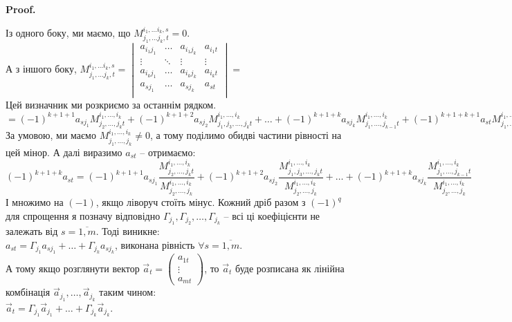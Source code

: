 \documentclass[a4paper, 10pt]{article}
\makeatletter
\theoremstyle{theoremdd}
\renewenvironment{proof}[1][Proof.\\]{\par
\pushQED{\hfill \qed}%
\normalfont \topsep6\p@\@plus6\p@\relax
\trivlist
\item\relax
{\bfseries
#1\@addpunct{.}}\hspace\labelsep\ignorespaces
}{%
\popQED\endtrivlist\@endpefalse
}
\makeatother
\begin{document}
\begin{proof}
Із одного боку, ми маємо, що $M_{j_1,\dots j_k,t}^{i_1, \dots i_k,s} = 0$.\\
А з іншого боку, $M_{j_1,\dots j_k,t}^{i_1, \dots i_k,s} = \begin{vmatrix}
a_{i_1 j_1} & \dots & a_{i_1 j_k} & a_{i_1 t} \\
\vdots & \ddots & \vdots & \vdots \\
a_{i_k j_1} & \dots & a_{i_k j_k} & a_{i_k t} \\
a_{s j_1} & \dots & a_{s j_k} & a_{s t} \\
\end{vmatrix} \boxed{=}$\\
Цей визначник ми розкриємо за останнім рядком.\\
$\boxed{=} (-1)^{k+1+1} a_{sj_1} M_{j_2,\dots,j_k t}^{i_1,\dots,i_k} + (-1)^{k+1+2} a_{sj_2} M_{j_1,j_3,\dots,j_k t}^{i_1,\dots,i_k} + \dots + (-1)^{k+1+k} a_{sj_k}M_{j_1,\dots,j_{k-1} t}^{i_1,\dots,i_k} + (-1)^{k+1+k+1}a_{st} M_{j_1,\dots,j_k}^{i_1,\dots,i_k}$\\
За умовою, ми маємо $M_{j_1,\dots,j_k}^{i_1,\dots,i_k} \neq 0$, а тому поділимо обидві частини рівності на цей мінор. А далі виразимо $a_{st}$ -- отримаємо:\\
$(-1)^{k+1+k}a_{st} = (-1)^{k+1+1} a_{sj_1} \dfrac{M_{j_2,\dots,j_k t}^{i_1,\dots,i_k}}{M_{j_2,\dots,j_k}^{i_1,\dots,i_k}}  + (-1)^{k+1+2} a_{sj_2} \dfrac{M_{j_1,j_3,\dots,j_k t}^{i_1,\dots,i_k}}{M_{j_2,\dots,j_k}^{i_1,\dots,i_k}} + \dots + (-1)^{k+1+k} a_{sj_k} \dfrac{M_{j_1,\dots,j_{k-1} t}^{i_1,\dots,i_k}}{M_{j_2,\dots,j_k}^{i_1,\dots,i_k}}$\\
І множимо на $(-1)$, якщо ліворуч стоїть мінус. Кожний дріб разом з $(-1)^q$ для спрощення я позначу відповідно $\Gamma_{j_1}, \Gamma_{j_2},\dots,\Gamma_{j_k}$ -- всі ці коефіцієнти не залежать від $s = \overline{1,m}$. Тоді виникне:\\
$a_{st} = \Gamma_{j_1} a_{sj_1} + \dots + \Gamma_{j_k} a_{sj_k}$, виконана рівність $\forall s = \overline{1,m}$. \\
А тому якщо розглянути вектор $\vec{a}_t = \begin{pmatrix}
a_{1t} \\ \vdots \\ a_{mt}
\end{pmatrix}$, то $\vec{a}_t$ буде розписана як лінійна комбінація $\vec{a}_{j_1},\dots,\vec{a}_{j_k}$ таким чином:\\
$\vec{a}_t = \Gamma_{j_1} \vec{a}_{j_1} + \dots + \Gamma_{j_k} \vec{a}_{j_k}$.\\

\end{proof}
\end{document}
